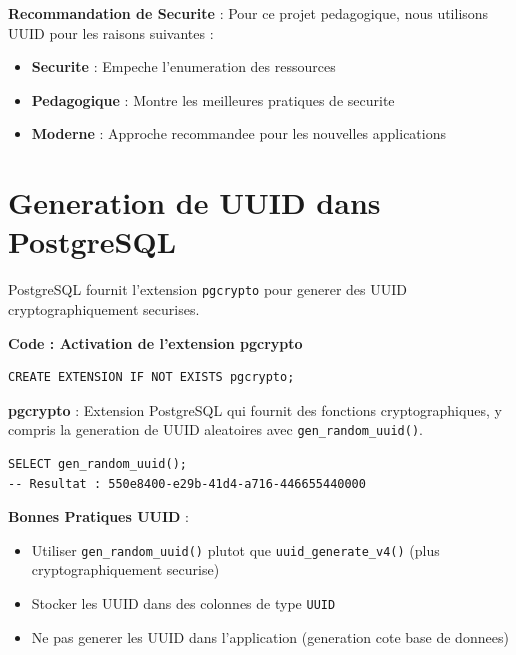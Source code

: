 \documentclass[a4paper,12pt]{book}
\begin{document}
\begin{securitybox}
    \textbf{Recommandation de Securite} :
    Pour ce projet pedagogique, nous utilisons UUID pour les raisons suivantes :
    \begin{itemize}
        \item \textbf{Securite} : Empeche l'enumeration des ressources
        \item \textbf{Pedagogique} : Montre les meilleures pratiques de securite
        \item \textbf{Moderne} : Approche recommandee pour les nouvelles applications
    \end{itemize}
\end{securitybox}

\section{Generation de UUID dans PostgreSQL}

PostgreSQL fournit l'extension \texttt{pgcrypto} pour generer des UUID cryptographiquement securises.

\noindent\textbf{Code : Activation de l'extension pgcrypto}
\begin{lstlisting}[style=sql]
CREATE EXTENSION IF NOT EXISTS pgcrypto;
\end{lstlisting}

\begin{definitionbox}
    \textbf{pgcrypto} : Extension PostgreSQL qui fournit des fonctions cryptographiques, y compris la generation de UUID aleatoires avec \texttt{gen\_random\_uuid()}.
\end{definitionbox}

\begin{lstlisting}[style=sql, caption=Generation d'un UUID]
SELECT gen_random_uuid();
-- Resultat : 550e8400-e29b-41d4-a716-446655440000
\end{lstlisting}

\begin{bestpracticebox}
    \textbf{Bonnes Pratiques UUID} :
    \begin{itemize}
        \item Utiliser \texttt{gen\_random\_uuid()} plutot que \texttt{uuid\_generate\_v4()} (plus cryptographiquement securise)
        \item Stocker les UUID dans des colonnes de type \texttt{UUID}
        \item Ne pas generer les UUID dans l'application (generation cote base de donnees)
    \end{itemize}
\end{bestpracticebox}
\end{document}
